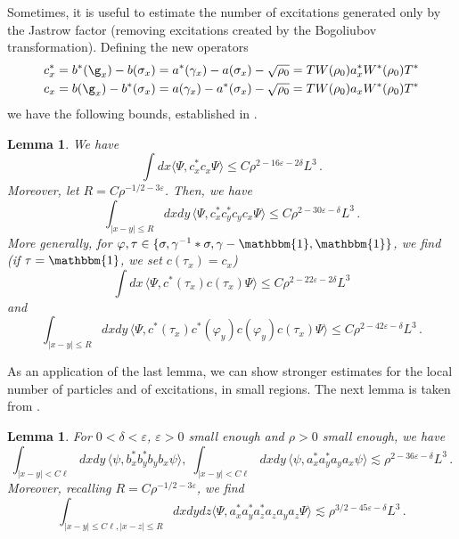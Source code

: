 \documentclass[a4paper,11pt]{article}
\def\eps{\varepsilon}
\def\ph{\varphi}
\newtheorem{lemma}[theorem]{Lemma}
\numberwithin{equation}{section}
\let\s=\sigma \let\t=\tau     \let\f=\phi    \let\ph=\varphi   \let\c=\chi
\begin{document}
Sometimes, it is useful to estimate the number of excitations generated only by the Jastrow factor (removing excitations created by the Bogoliubov transformation). Defining the new operators
\begin{equation}\label{eq:def-cc}
\begin{split} 
c^*_x &=b^*(\g_x)-b(\s_x)= a^* (\gamma_x) - a (\sigma_x) - \sqrt{\rho_0} = T W (\rho_0) a^*_x W^* (\rho_0) T^* \\
c_x &=b(\g_x)-b^*(\s_x)= a (\gamma_x) - a^* (\sigma_x) - \sqrt{\rho_0} =  T W (\rho_0) a_x W^* (\rho_0) T^* 
\end{split} \end{equation} 
we have the following bounds, established in \cite[Lemma 4.5]{BBCOS}.
\begin{lemma} \label{lm:c's}
We have 
\begin{equation}\label{eq:cc-claim} \int dx \langle \Psi, c_x^* c_x \Psi \rangle \leq C \rho^{2-16\eps-2\delta} L^3\,. \end{equation} 
Moreover, let $R = C \rho^{-1/2-3\eps}$. Then, we have 
\begin{equation}\label{eq:cccc-claim} \int_{|x-y| \leq R} dx dy  \, \langle \Psi,  c_x^* c_y^* c_y c_x  \Psi \rangle \leq C \rho^{2-30\eps-\delta} L^3 \,.
\end{equation} 
More generally, for $\ph, \tau \in \{ \sigma, \gamma^{-1}\ast \sigma, \gamma -\mathbbm{1}, \mathbbm{1} \}$, we find (if $\tau = \mathbbm{1}$, we set $c (\tau_x) = c_x$) 
\begin{equation}\label{eq:cc-gh}
\int dx \, \langle \Psi, c^* (\tau_x) c (\tau_x) \Psi \rangle \leq C \rho^{2-22\eps-2\delta} L^3 \end{equation}
and  
\begin{equation}\label{eq:cccc-gh} 
\int_{|x-y| \leq R} dx dy  \, \langle \Psi,  c^* (\tau_x) c^* (\ph_y) c (\ph_y) c (\tau_x)  \Psi \rangle \leq C \rho^{2-42\eps-\delta} L^3 \,.
\end{equation} 
\end{lemma} 
As an application of the last lemma, we can show stronger estimates for the local number of particles and of excitations, in small regions. The next lemma is taken from \cite[Lemma 4.6]{BBCOS} .
\begin{lemma} \label{lm:aaaaC} 
For $0 < \delta < \eps$, $\eps > 0$ small enough and $\rho > 0$ small enough, we have 
\begin{equation}\label{eq:aaaaC} \int_{|x-y| < C \ell} dx dy \, \langle \psi, b_x^* b_y^* b_y b_x \psi \rangle , \; \int_{|x-y| < C \ell} dx dy \, \langle \psi, a_x^* a_y^* a_y a_x \psi \rangle  \lesssim \rho^{2-36\eps-\delta} L^3\,. \end{equation} 
Moreover, recalling $R = C \rho^{-1/2-3\eps}$, we find  
\begin{equation}\label{eq:aaaCR} \int_{|x-y| \leq C \ell, |x-z| \leq R} dx dy dz \langle \Psi, a_x^* a_y^* a_z^* a_z a_y a_z \Psi \rangle \lesssim \rho^{3/2-45\eps-\delta} L^3\,. \end{equation}
\end{lemma} 
\end{document}
